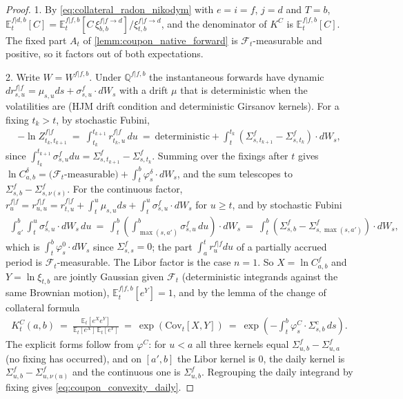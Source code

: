 \documentclass[11pt,english]{amsart}
\newcommand{\EE}{\mathbb{E}}
\newcommand{\QQ}{\mathbb{Q}}
\newcommand{\Cov}{\mathrm{Cov}}
\theoremstyle{definition}
\begin{document}
\begin{proof}
1. By \eqref{eq:collateral_radon_nikodym} with $e = i = f$, $j = d$ and $T = b$, $\EE^{f|d,b}_t[C] = \EE^{f|f,b}_t[C\,\xi^{f|f\to d}_{b,b}]/\xi^{f|f\to d}_{t,b}$, and the denominator of $K^C$ is $\EE^{f|f,b}_t[C]$. The fixed part $A_t$ of \autoref{lemm:coupon_native_forward} is $\mathcal{F}_t$-measurable and positive, so it factors out of both expectations.

2. Write $W = W^{f|f,b}$. Under $\QQ^{f|f,b}$ the instantaneous forwards have dynamic $dr^{f|f}_{s,u} = \mu_{s,u}ds + \sigma^f_{s,u}\cdot dW_s$ with a drift $\mu$ that is deterministic when the volatilities are (HJM drift condition and deterministic Girsanov kernels). For a fixing $t_k>t$, by stochastic Fubini,
\begin{eqnarray*}
  -\ln Z^{f|f}_{t_k,t_{k+1}} ~=~ \int_{t_k}^{t_{k+1}} r^{f|f}_{t_k,u}\,du ~=~ \textrm{deterministic} + \int_t^{t_k}\left(\Sigma^f_{s,t_{k+1}}-\Sigma^f_{s,t_k}\right)\cdot dW_s ,
\end{eqnarray*}
since $\int_{t_k}^{t_{k+1}}\sigma^f_{s,u}du = \Sigma^f_{s,t_{k+1}}-\Sigma^f_{s,t_k}$. Summing over the fixings after $t$ gives $\ln C^{\delta}_{a,b} = \textrm{($\mathcal{F}_t$-measurable)} + \int_t^b\varphi^\delta_s\cdot dW_s$, and the sum telescopes to $\Sigma^f_{s,b}-\Sigma^f_{s,\nu(s)}$. For the continuous factor, $r^{f|f}_u = r^{f|f}_{u,u} = r^{f|f}_{t,u} + \int_t^u\mu_{s,u}ds + \int_t^u\sigma^f_{s,u}\cdot dW_s$ for $u\ge t$, and by stochastic Fubini
\begin{eqnarray*}
  \int_{a'}^b\int_t^u \sigma^f_{s,u}\cdot dW_s\,du ~=~ \int_t^b \left(\int_{\max(s,a')}^b\sigma^f_{s,u}\,du\right)\cdot dW_s ~=~ \int_t^b\left(\Sigma^f_{s,b}-\Sigma^f_{s,\max(s,a')}\right)\cdot dW_s ,
\end{eqnarray*}
which is $\int_t^b\varphi^0_s\cdot dW_s$ since $\Sigma^f_{s,s} = 0$; the part $\int_a^{t}r^{f|f}_udu$ of a partially accrued period is $\mathcal{F}_t$-measurable. The Libor factor is the case $n=1$. So $X = \ln C^f_{a,b}$ and $Y = \ln\xi_{t,b}$ are jointly Gaussian given $\mathcal{F}_t$ (deterministic integrands against the same Brownian motion), $\EE^{f|f,b}_t[e^Y] = 1$, and by the lemma of the change of collateral formula
\begin{eqnarray*}
  K^C_t(a,b) ~=~ \frac{\EE_t[e^Xe^Y]}{\EE_t[e^X]\,\EE_t[e^Y]} ~=~ \exp\left(\Cov_t[X,Y]\right) ~=~ \exp\left(-\int_t^b\varphi^C_s\cdot\Sigma^c_{s,b}\,ds\right) .
\end{eqnarray*}
The explicit forms follow from $\varphi^C$: for $u<a$ all three kernels equal $\Sigma^f_{u,b}-\Sigma^f_{u,a}$ (no fixing has occurred), and on $[a',b]$ the Libor kernel is $0$, the daily kernel is $\Sigma^f_{u,b}-\Sigma^f_{u,\nu(u)}$ and the continuous one is $\Sigma^f_{u,b}$. Regrouping the daily integrand by fixing gives \eqref{eq:coupon_convexity_daily}.
\end{proof}
\end{document}
